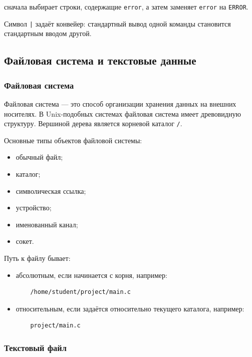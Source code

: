 \documentclass[12pt,a4paper]{article}
\begin{document}
сначала выбирает строки, содержащие \texttt{error}, а затем заменяет \texttt{error} на \texttt{ERROR}.

Символ \texttt{|} задаёт конвейер: стандартный вывод одной команды становится стандартным вводом другой.

\subsection{Файловая система и текстовые данные}

\subsubsection{Файловая система}

Файловая система --- это способ организации хранения данных на внешних носителях. В Unix-подобных системах файловая система имеет древовидную структуру. Вершиной дерева является корневой каталог \texttt{/}.

Основные типы объектов файловой системы:

\begin{itemize}
    \item обычный файл;
    \item каталог;
    \item символическая ссылка;
    \item устройство;
    \item именованный канал;
    \item сокет.
\end{itemize}

Путь к файлу бывает:

\begin{itemize}
    \item абсолютным, если начинается с корня, например:
    \begin{verbatim}
    /home/student/project/main.c
    \end{verbatim}

    \item относительным, если задаётся относительно текущего каталога, например:
    \begin{verbatim}
    project/main.c
    \end{verbatim}
\end{itemize}

\subsubsection{Текстовый файл}
\end{document}
